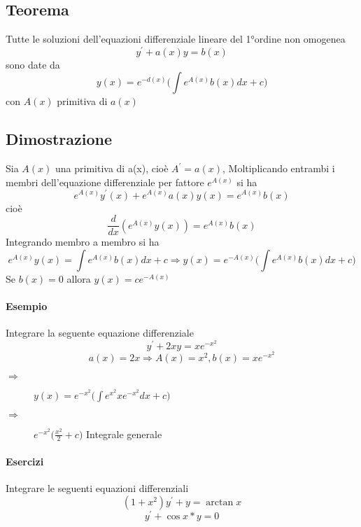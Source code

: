 \subsection{Teorema}
Tutte le soluzioni dell'equazioni differenziale lineare del 1°ordine non omogenea
\begin{equation}
	y^\prime+a(x)y=b(x)
\end{equation}
sono date da
\begin{equation*}
	y(x)=e^{-d(x)}\bigg(\int e^{A(x)}b(x)dx+c\bigg)
\end{equation*}
con $A(x)$ primitiva di $a(x)$
\subsection{Dimostrazione}
Sia $A(x)$ una primitiva di a(x), cioè $A^\prime=a(x)$, Moltiplicando entrambi i membri dell'equazione differenziale per fattore $e^{A(x)}$ si ha
\begin{equation}
	e^{A(x)}y^\prime(x)+e^{A(x)}a(x)y(x)=e^{A(x)}b(x)
\end{equation}
cioè
\begin{equation}
	\frac{d}{dx}(e^{A(x)}y(x))=e^{A(x)}b(x)
\end{equation}
Integrando membro a membro si ha
\begin{equation*}
	e^{A(x)}y(x)=\int e^{A(x)}b(x)dx+c \Rightarrow y(x)=e^{-A(x)}\bigg(\int e^{A(x)} b(x)dx+c\bigg)
\end{equation*}
Se $b(x)=0$ allora $y(x)=ce^{-A(x)}$
\paragraph{Esempio} Integrare la seguente equazione differenziale
\begin{equation}
	y^\prime+2xy=xe^{-x^2}
\end{equation}
\begin{equation*}
	a(x)=2x\Rightarrow A(x)=x^2,b(x)=xe^{-x^2}
\end{equation*}
\begin{description}
\item[$\Rightarrow$ ] $y(x)=e^{-x^2}\bigg(\int e^{x^2}xe^{-x^2}dx+c\bigg)$ 
\item[$\Rightarrow$ ] $e^{-x^2}\bigg(\frac{x^2}{2}+c\bigg)$ Integrale generale
\end{description}
\paragraph{Esercizi} Integrare le seguenti equazioni differenziali
\begin{equation*}
	(1+x^2)y^\prime+y=\arctan x
\end{equation*}
\begin{equation*}
	y^\prime+\cos x*y=0
\end{equation*}
